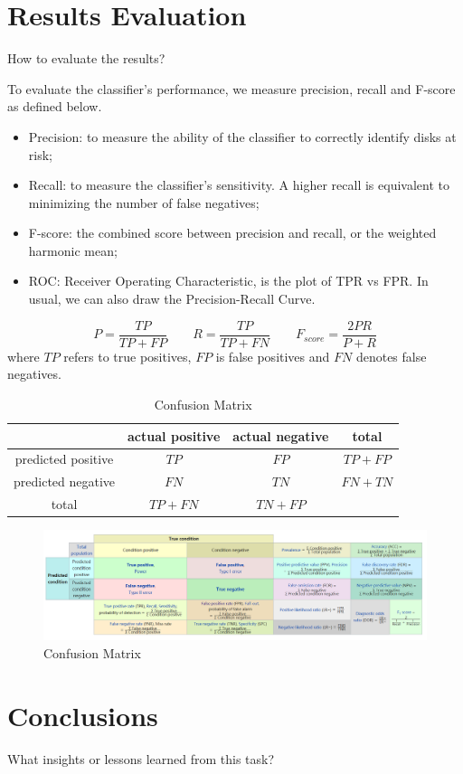 \documentclass[12pt,a4paper,english]{amsart}
\begin{document}
%
\section{Results Evaluation}

How to evaluate the results?

To evaluate the classifier's performance, we measure precision, recall and F-score as defined below.
\begin{itemize}
	\item Precision: to measure the ability of the classifier to correctly identify disks at risk;
	\item Recall: to measure the classifier's sensitivity. A higher recall is equivalent to minimizing the number of false negatives;
	\item F-score: the combined score between precision and recall, or the weighted harmonic mean;
	\item ROC: Receiver Operating Characteristic, is the plot of TPR vs FPR. In usual, we can also draw the Precision-Recall Curve.
\end{itemize}

\begin{equation}
	P = \dfrac{TP}{TP+FP} \quad\quad 
	R = \dfrac{TP}{TP+FN} \quad\quad 
	F_{score} = \dfrac{2PR}{P+R}
\end{equation}
where $TP$ refers to true positives, $FP$ is false positives and $FN$ denotes false negatives.

\begin{table}
	\caption{Confusion Matrix}
	\centering
	\begin{tabular}{|c|c|c|c|}
		\hline
		& actual positive & actual negative & total \\
		\hline
		predicted positive & $TP$ & $FP$ & $TP+FP$ \\
		\hline
		predicted negative & $FN$ & $TN$ & $FN+TN$ \\
		\hline
		total	&	$TP+FN$ & $TN+FP$ & \\
		\hline
	\end{tabular}
\end{table}

\begin{figure}[htb]
	\centering
	\includegraphics[width=\textwidth]{img/auc.PNG}
	\caption{Confusion Matrix}
\end{figure}
%
\section{Conclusions}

What insights or lessons learned from this task?
\cite{Ren2018a}



\end{document}
